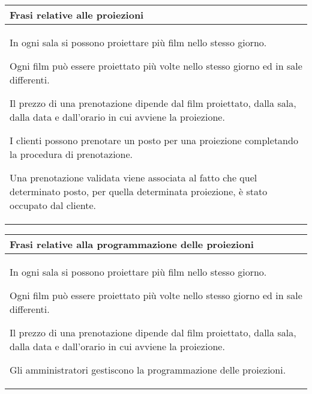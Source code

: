 \begin{tabularx}{\linewidth}{|X|}
      \hline
      \rowcolor{tblhdrcolor}
      \textbf{Frasi relative alle proiezioni} \\\hline
      In ogni sala si possono proiettare più film nello stesso giorno.

      Ogni film può essere proiettato più volte nello stesso giorno ed in sale
      differenti.

      Il prezzo di una prenotazione dipende dal film proiettato, dalla
      sala, dalla data e dall'orario in cui avviene la proiezione.

      I clienti possono prenotare un posto per una proiezione
      completando la procedura di prenotazione.

      Una prenotazione validata viene associata al fatto che quel
      determinato posto, per quella determinata proiezione,
      è stato occupato dal cliente.
      \\ \hline
\end{tabularx}

\begin{tabularx}{\linewidth}{|X|}
      \hline
      \rowcolor{tblhdrcolor}
      \textbf{Frasi relative alla programmazione delle proiezioni} \\\hline

      In ogni sala si possono proiettare più film nello stesso giorno.

      Ogni film può essere proiettato più volte nello stesso giorno ed in sale
      differenti.

      Il prezzo di una prenotazione dipende dal film proiettato, dalla
      sala, dalla data e dall'orario in cui avviene la proiezione.

      Gli amministratori gestiscono la programmazione delle proiezioni.
      \\ \hline
\end{tabularx}

